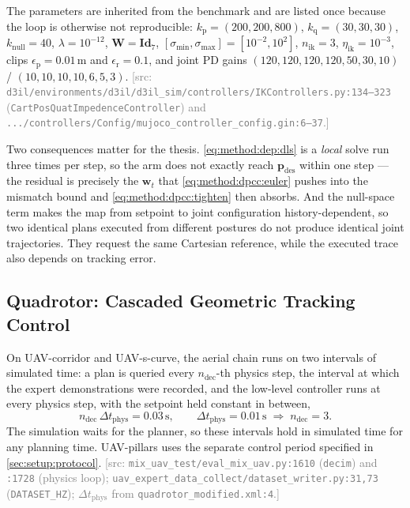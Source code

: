 \documentclass[headsepline,footsepline,footinclude=false,oneside,fontsize=11pt,paper=a4,listof=totoc,bibliography=totoc]{scrbook}
\theoremstyle{definition}
\theoremstyle{plain}
\theoremstyle{remark}
\newcommand{\vect}[1]{\boldsymbol{#1}}
\newcommand{\matr}[1]{\boldsymbol{#1}}
\newcommand{\sidx}[1]{_{\textrm{#1}}}
\newcommand{\Id}[1]{\textbf{Id}_{#1}}
\newif\ifsubmission
\newcommand{\srcnote}[1]{\ifsubmission\else\textcolor{gray}{\footnotesize\textsf{[src: #1]}}\fi}
\begin{document}
The parameters are inherited from the benchmark and are listed once because the loop is otherwise
not reproducible: $k\sidx{p} = (200,200,800)$, $k\sidx{q} = (30,30,30)$, $k\sidx{null} = 40$,
$\lambda = 10^{-12}$, $\matr{W} = \Id{7}$, $[\sigma\sidx{min},\sigma\sidx{max}] = [10^{-2},10^{2}]$,
$n\sidx{ik} = 3$, $\eta\sidx{ik} = 10^{-3}$, clips $\epsilon\sidx{p} = 0.01\,\textrm{m}$ and
$\epsilon\sidx{r} = 0.1$, and joint PD gains
$(120,120,120,120,50,30,10)$ / $(10,10,10,10,6,5,3)$.
\srcnote{\texttt{d3il/environments/d3il/d3il\_sim/controllers/IKControllers.py:134--323}
(\texttt{CartPosQuatImpedenceController}) and
\texttt{.../controllers/Config/mujoco\_controller\_config.gin:6--37}.}

Two consequences matter for the thesis. \eqref{eq:method:dep:dls} is a \emph{local} solve run three
times per step, so the arm does not exactly reach $\vect{p}\sidx{des}$ within one step --- the residual
is precisely the $\vect{w}_{t}$ that \eqref{eq:method:dpcc:euler} pushes into the mismatch bound and
\eqref{eq:method:dpcc:tighten} then absorbs. And the null-space term makes the map from setpoint to
joint configuration history-dependent, so two identical plans executed from different postures do not
produce identical joint trajectories. They request the same Cartesian reference, while the executed
trace also depends on tracking error.

\subsection{Quadrotor: Cascaded Geometric Tracking Control}\label{sec:method:geometric}

On UAV-corridor and UAV-s-curve, the aerial chain runs on two intervals of simulated time: a plan is queried every $n\sidx{dec}$-th physics step, the interval at which the expert
demonstrations were recorded, and the low-level controller runs at every physics step, with the
setpoint held constant in between,
\begin{equation}\label{eq:method:dep:multirate}
  n\sidx{dec}\,\Delta t\sidx{phys} = 0.03\,\textrm{s},
  \qquad
  \Delta t\sidx{phys} = 0.01\,\textrm{s}
  \;\Rightarrow\; n\sidx{dec} = 3 .
\end{equation}
The simulation waits for the planner, so these intervals hold in simulated time for any planning
time. UAV-pillars uses the separate control period specified in \autoref{sec:setup:protocol}.
\srcnote{\texttt{mix\_uav\_test/eval\_mix\_uav.py:1610} (\texttt{decim}) and \texttt{:1728} (physics loop);
\texttt{uav\_expert\_data\_collect/dataset\_writer.py:31,73} (\texttt{DATASET\_HZ});
$\Delta t\sidx{phys}$ from \texttt{quadrotor\_modified.xml:4}.}
\end{document}
